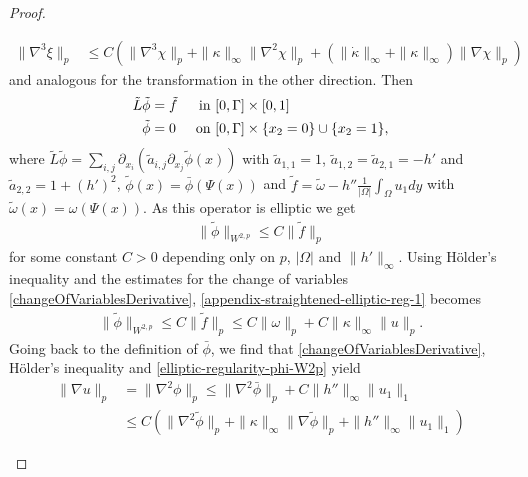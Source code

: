 \documentclass{article}
\theoremstyle{definition}
\theoremstyle{definition}
\begin{document}
\begin{proof}
\begin{itemize}
\begin{equation}
\begin{aligned}
            \|\nabla^3\xi\|_p &\leq C\left(\|\nabla^3\chi\|_p+\|\kappa\|_\infty\|\nabla^2\chi\|_p+(\|\dot\kappa\|_\infty+\|\kappa\|_\infty)\|\nabla \chi\|_p\right)
        \end{aligned}
    \end{equation}
    and analogous for the transformation in the other direction.
    Then
    \begin{equation}
        \label{elliptic-regularity-pde-tilde-phi}
        \begin{aligned}
            \tilde L\tilde \phi&=\tilde f & \textnormal{ in }&[0,\Gamma]\times [0,1]
            \\
            \tilde \phi &= 0  & \textnormal{ on }&[0,\Gamma]\times \lbrace x_2=0\rbrace \cup \lbrace x_2=1\rbrace,
        \end{aligned}
    \end{equation}
    where $\tilde L \tilde \phi=\sum_{i,j} \partial_{x_i}(\tilde a_{i,j}\partial_{x_j}\tilde \phi(x))$ with $\tilde a_{1,1}=1$, $\tilde a_{1,2}=\tilde a_{2,1}=-h'$ and $\tilde a_{2,2}=1+(h')^2$, $\tilde \phi(x)=\bar \phi(\Psi(x))$ and $\tilde f=\tilde\omega-h''\frac{1}{|\Omega|}\int_{\Omega} u_1 dy$ with $\tilde \omega (x) = \omega(\Psi(x))$. As this operator is elliptic we get
    \begin{align}
        \label{appendix-straightened-elliptic-reg-1}
        \|\tilde \phi\|_{W^{2,p}}\leq C \|\tilde f\|_p
    \end{align}
    for some constant $C>0$ depending only on $p$, $|\Omega|$ and $\|h'\|_{\infty}$. Using Hölder's inequality and the estimates for the change of variables \eqref{changeOfVariablesDerivative}, \eqref{appendix-straightened-elliptic-reg-1} becomes
    \begin{align}
        \label{elliptic-regularity-phi-W2p}
        \|\tilde\phi\|_{W^{2,p}} \leq C\|\tilde f\|_p \leq C \|\omega\|_p + C \|\kappa\|_\infty \|u\|_p.
    \end{align}
    Going back to the definition of $\bar \phi$, we find that \eqref{changeOfVariablesDerivative}, Hölder's inequality and \eqref{elliptic-regularity-phi-W2p} yield
    \begin{equation}
        \label{ellptic-regularity-gradu-by-omega}
        \begin{aligned}
            \|\nabla u\|_p &= \|\nabla^2\phi\|_p \leq \|\nabla^2\bar \phi\|_p + C\|h''\|_\infty \|u_1\|_1
            \\
            &
            \leq C \left(\|\nabla^2 \tilde \phi\|_p + \|\kappa\|_\infty \|\nabla \tilde\phi\|_p + \|h''\|_\infty \|u_1\|_1\right)

\end{aligned}
\end{equation}
\end{itemize}
\end{proof}
\end{document}
